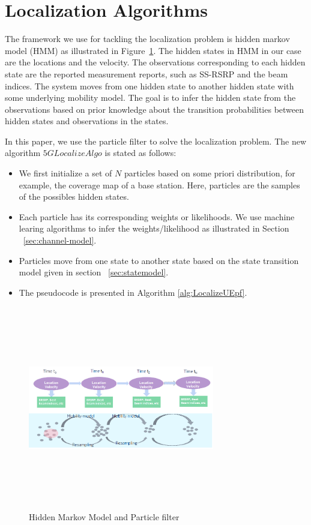 \documentclass[conference, 10pt]{IEEEtran}
\begin{document}
\section{Localization Algorithms}
\label{sec:localalgo}

The framework we use for tackling the localization problem is hidden markov model (HMM) as illustrated 
in Figure~\ref{fig:hmm_particle}. The hidden states in HMM in our case are the locations and the velocity. 
The observations corresponding to each hidden state are the reported measurement reports, such as SS-RSRP and the beam indices.
The system moves from one hidden state to another hidden state with some underlying mobility model. 
The goal is to infer the hidden state from the observations based on
prior knowledge about the transition probabilities between hidden states and
observations in the states.

In this paper, we use the particle filter to solve the localization problem. The new algorithm $5GLocalizeAlgo$ is stated as follows:
\begin{itemize}
	\item We first initialize a set of $N$ particles based on some priori distribution, for example, the coverage map of a base station.
	Here, particles are the samples of the possibles hidden states. 
	\item Each particle has its corresponding weights or likelihoods. We use machine learing algorithms to infer the weights/likelihood as illustrated in Section ~\ref{sec:channel-model}.
	\item Particles move from one state to another state based 
	on the state transition model given in section ~\ref{sec:statemodel}.
	\item The pseudocode is presented in Algorithm \ref{alg:LocalizeUEpf}.
\end{itemize}

\begin{figure}[t]
	\begin{center}
	\includegraphics[height=3.5in,width=3.2in]{./HMM_ParticleFilter_Illustration.png}
	\caption{\label{fig:hmm_particle}
	{\small Hidden Markov Model and Particle filter}}
	\end{center}
	\end{figure}
\end{document}
